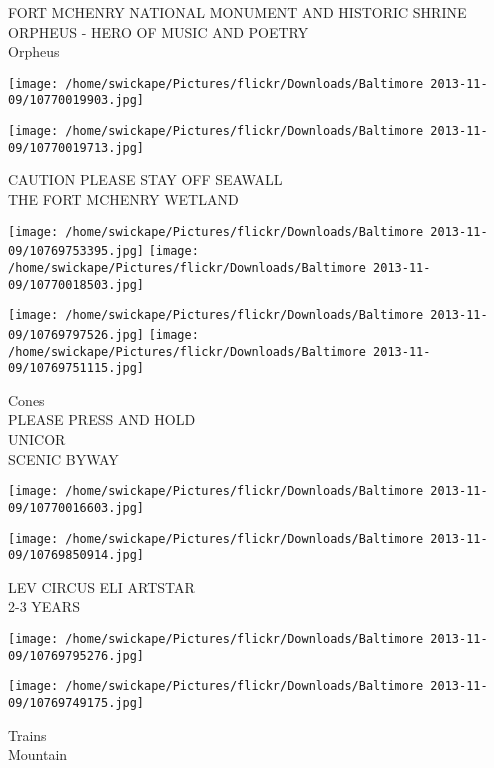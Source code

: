 \documentclass[10pt,letterpaper]{article}
\begin{document}
FORT MCHENRY NATIONAL MONUMENT AND HISTORIC SHRINE\\
ORPHEUS {-} HERO OF MUSIC AND POETRY\\
Orpheus\\
\pagebreak

\texttt{[image: /home/swickape/Pictures/flickr/Downloads/Baltimore 2013-11-09/10770019903.jpg]}

\vspace{0.25in}
\texttt{[image: /home/swickape/Pictures/flickr/Downloads/Baltimore 2013-11-09/10770019713.jpg]}

CAUTION PLEASE STAY OFF SEAWALL\\
THE FORT MCHENRY WETLAND\\
\pagebreak

\texttt{[image: /home/swickape/Pictures/flickr/Downloads/Baltimore 2013-11-09/10769753395.jpg]}
\texttt{[image: /home/swickape/Pictures/flickr/Downloads/Baltimore 2013-11-09/10770018503.jpg]}

\texttt{[image: /home/swickape/Pictures/flickr/Downloads/Baltimore 2013-11-09/10769797526.jpg]}
\texttt{[image: /home/swickape/Pictures/flickr/Downloads/Baltimore 2013-11-09/10769751115.jpg]}

Cones\\
PLEASE PRESS AND HOLD\\
UNICOR\\
SCENIC BYWAY\\
\pagebreak

\texttt{[image: /home/swickape/Pictures/flickr/Downloads/Baltimore 2013-11-09/10770016603.jpg]}

\vspace{0.25in}
\texttt{[image: /home/swickape/Pictures/flickr/Downloads/Baltimore 2013-11-09/10769850914.jpg]}

LEV CIRCUS ELI ARTSTAR\\
2{-}3 YEARS\\
\pagebreak

\texttt{[image: /home/swickape/Pictures/flickr/Downloads/Baltimore 2013-11-09/10769795276.jpg]}

\vspace{0.25in}
\texttt{[image: /home/swickape/Pictures/flickr/Downloads/Baltimore 2013-11-09/10769749175.jpg]}

Trains\\
Mountain\\
\pagebreak
\end{document}
